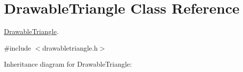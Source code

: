\hypertarget{classDrawableTriangle}{}\section{Drawable\+Triangle Class Reference}
\label{classDrawableTriangle}


\hyperlink{classDrawableTriangle}{Drawable\+Triangle}.  




{\ttfamily \#include $<$drawabletriangle.\+h$>$}



Inheritance diagram for Drawable\+Triangle\+:
